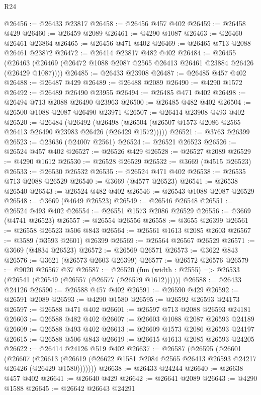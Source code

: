\begin{lexlean}{R24}
\begin{coremodule}
@26456 := @26433 @23817
@26458 := @26456 @457 @402
@26459 := @26458 @429
@26460 := @26459 @2089
@26461 := @4290 @1087
@26463 := @26460 @26461 @23864
@26465 := @26456 @471 @402
@26469 := @26465 @713 @2088 @26461 @23872
@26472 := @26414 @23817 @482 @402
@26484 := @26455
    (@26463 (@26469 (@26472 @1088 @2087 @2565 @26413 @26461 @23884 @26426 (@26429 @1087))))
@26485 := @26433 @23908
@26487 := @26485 @457 @402
@26488 := @26487 @429
@26489 := @26488 @2089
@26490 := @4290 @1572
@26492 := @26489 @26490 @23955
@26494 := @26485 @471 @402
@26498 := @26494 @713 @2088 @26490 @23963
@26500 := @26485 @482 @402
@26504 := @26500 @1088 @2087 @26490 @23971
@26507 := @26414 @23908 @493 @402
@26520 := @26484
    (@26492 (@26498 (@26504 (@26507 @1573 @2086 @2565 @26413 @26490 @23983 @26426 (@26429 @1572)))))
@26521 := @3763 @26399
@26523 := @23636 (@24007 @2561)
@26524 := @26521 @26523
@26526 := @26524 @457 @402
@26527 := @26526 @429
@26528 := @26527 @2089
@26529 := @4290 @1612
@26530 := @26528 @26529
@26532 := @3669 (@4515 @26523)
@26533 := @26530 @26532
@26535 := @26524 @471 @402
@26538 := @26535 @713 @2088 @26529
@26540 := @3669 (@4577 @26523)
@26541 := @26538 @26540
@26543 := @26524 @482 @402
@26546 := @26543 @1088 @2087 @26529
@26548 := @3669 (@4649 @26523)
@26549 := @26546 @26548
@26551 := @26524 @493 @402
@26554 := @26551 @1573 @2086 @26529
@26556 := @3669 (@4741 @26523)
@26557 := @26554 @26556
@26558 := @3655 @26399
@26561 := @26558 @26523 @506 @843
@26564 := @26561 @1613 @2085 @2603
@26567 := @3589 (@3593 @2601) @26399
@26569 := @26564 @26567 @26529
@26571 := @3669 (@4834 @26523)
@26572 := @26569 @26571
@26573 := @3622 @843
@26576 := @3621 (@26573 @2603 @26399)
@26577 := @26572 @26576
@26579 := @9020 @26567 @37
@26587 := @26520 (fun (width : @2555) => @26533 (@26541 (@26549 (@26557 (@26577 (@26579 @1612))))))
@26588 := @26433 @24126
@26590 := @26588 @457 @402
@26591 := @26590 @429
@26592 := @26591 @2089
@26593 := @4290 @1580
@26595 := @26592 @26593 @24173
@26597 := @26588 @471 @402
@26601 := @26597 @713 @2088 @26593 @24181
@26603 := @26588 @482 @402
@26607 := @26603 @1088 @2087 @26593 @24189
@26609 := @26588 @493 @402
@26613 := @26609 @1573 @2086 @26593 @24197
@26615 := @26588 @506 @843
@26619 := @26615 @1613 @2085 @26593 @24205
@26622 := @26414 @24126 @519 @402
@26637 := @26587
    (@26595
      (@26601
        (@26607
          (@26613 (@26619 (@26622 @1581 @2084 @2565 @26413 @26593 @24217 @26426 (@26429 @1580)))))))
@26638 := @26433 @24244
@26640 := @26638 @457 @402
@26641 := @26640 @429
@26642 := @26641 @2089
@26643 := @4290 @1588
@26645 := @26642 @26643 @24291

\end{coremodule}
\end{lexlean}
